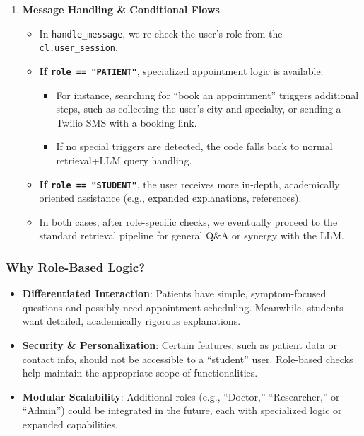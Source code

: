 \begin{enumerate}
    \item \textbf{Message Handling \& Conditional Flows}
    \begin{itemize}
        \item In \texttt{handle\_message}, we re-check the user’s role from the \texttt{cl.user\_session}.
        \item \textbf{If \texttt{role == "PATIENT"}}, specialized appointment logic is available:
            \begin{itemize}
                \item For instance, searching for “book an appointment” triggers additional steps, such as collecting the user’s city and specialty, or sending a Twilio SMS with a booking link.
                \item If no special triggers are detected, the code falls back to normal retrieval+LLM query handling.
            \end{itemize}
        \item \textbf{If \texttt{role == "STUDENT"}}, the user receives more in-depth, academically oriented assistance (e.g., expanded explanations, references).
        \item In both cases, after role-specific checks, we eventually proceed to the standard retrieval pipeline for general Q\&A or synergy with the LLM.
    \end{itemize}
\end{enumerate}

\subsubsection*{Why Role-Based Logic?}

\begin{itemize}
    \item \textbf{Differentiated Interaction}: Patients have simple, symptom-focused questions and possibly need appointment scheduling. Meanwhile, students want detailed, academically rigorous explanations.
    \item \textbf{Security \& Personalization}: Certain features, such as patient data or contact info, should not be accessible to a “student” user. Role-based checks help maintain the appropriate scope of functionalities.
    \item \textbf{Modular Scalability}: Additional roles (e.g., “Doctor,” “Researcher,” or “Admin”) could be integrated in the future, each with specialized logic or expanded capabilities.
\end{itemize}

